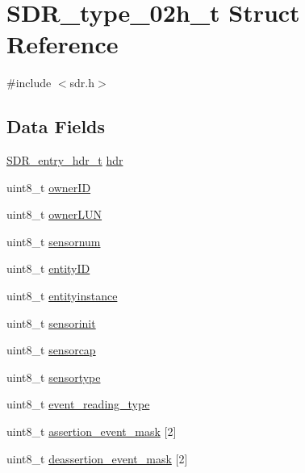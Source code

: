 \hypertarget{structSDR__type__02h__t}{\section{S\-D\-R\-\_\-type\-\_\-02h\-\_\-t Struct Reference}
\label{structSDR__type__02h__t}
}


{\ttfamily \#include $<$sdr.\-h$>$}

\subsection*{Data Fields}
\begin{DoxyCompactItemize}
\item 
\hyperlink{structSDR__entry__hdr__t}{S\-D\-R\-\_\-entry\-\_\-hdr\-\_\-t} \hyperlink{structSDR__type__02h__t_af58099c063cdbe10f57f91a64db81401}{hdr}
\item 
uint8\-\_\-t \hyperlink{structSDR__type__02h__t_acf4053f4d4374c2147201d678ac5700b}{owner\-I\-D}
\item 
uint8\-\_\-t \hyperlink{structSDR__type__02h__t_a0b91e15b84dad8d96b2be7278c3e37a9}{owner\-L\-U\-N}
\item 
uint8\-\_\-t \hyperlink{structSDR__type__02h__t_a1279df7a14fa05e5edb35d20fd15f5f2}{sensornum}
\item 
uint8\-\_\-t \hyperlink{structSDR__type__02h__t_ab9e8f309ce40520ba41bfa291f57609b}{entity\-I\-D}
\item 
uint8\-\_\-t \hyperlink{structSDR__type__02h__t_af307250c70558431020e09892ea5445e}{entityinstance}
\item 
uint8\-\_\-t \hyperlink{structSDR__type__02h__t_ab1760fa636296616ba944462a8dc016e}{sensorinit}
\item 
uint8\-\_\-t \hyperlink{structSDR__type__02h__t_abb62f49e21ce76d20df4b2d303e00d90}{sensorcap}
\item 
uint8\-\_\-t \hyperlink{structSDR__type__02h__t_a57e34a84f7ea6f1c9aae57eb94945433}{sensortype}
\item 
uint8\-\_\-t \hyperlink{structSDR__type__02h__t_aee192de7ba63619aec6c74fd563a98f8}{event\-\_\-reading\-\_\-type}
\item 
uint8\-\_\-t \hyperlink{structSDR__type__02h__t_a5e7046ddee8bff158b8cc2a444254cf9}{assertion\-\_\-event\-\_\-mask} \mbox{[}2\mbox{]}
\item 
uint8\-\_\-t \hyperlink{structSDR__type__02h__t_ad52533f44104cd021f2060e2751bd2b0}{deassertion\-\_\-event\-\_\-mask} \mbox{[}2\mbox{]}

\end{DoxyCompactItemize}
